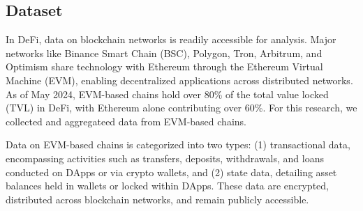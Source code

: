 \documentclass[runningheads]{llncs}
\begin{document}
{\subsection{Dataset}
In DeFi, data on blockchain networks is readily accessible for analysis. Major networks like Binance Smart Chain (BSC), Polygon, Tron, Arbitrum, and Optimism share technology with Ethereum through the Ethereum Virtual Machine (EVM), enabling decentralized applications across distributed networks. As of May 2024, EVM-based chains hold over 80\% of the total value locked (TVL) in DeFi, with Ethereum alone contributing over 60\%. For this research, we collected and aggregateed data from EVM-based chains.

Data on EVM-based chains is categorized into two types: (1) transactional data, encompassing activities such as transfers, deposits, withdrawals, and loans conducted on DApps or via crypto wallets, and (2) state data, detailing asset balances held in wallets or locked within DApps. These data are encrypted, distributed across blockchain networks, and remain publicly accessible.



}
\end{document}
